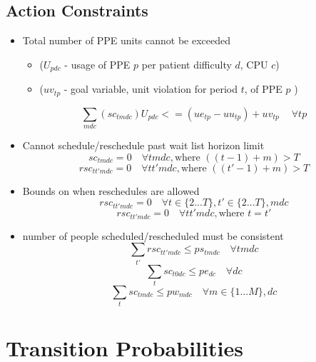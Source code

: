 \documentclass{article}
\begin{document}
\subsection{Action Constraints}
\begin{itemize}
    \item Total number of PPE units cannot be exceeded  
    \begin{itemize}
    	\item ($U_{pdc}$ - usage of PPE $p$ per patient difficulty $d$, CPU $c$)
    	\item ($uv_{tp}$ - goal variable, unit violation for period $t$, of PPE $p$ )
    \end{itemize}
        \[ \sum_{mdc}(sc_{tmdc})U_{pdc} <= (ue_{tp} - uu_{tp}) + uv_{tp}\ \quad \forall tp \]
	\item Cannot schedule/reschedule past wait list horizon limit
		\[ sc_{tmdc} = 0 \quad \forall tmdc, \text{where } ((t-1)+m) > T \]
		\[ rsc_{tt'mdc} = 0 \quad \forall tt'mdc, \text{where } ((t'-1)+m) > T \]
	\item Bounds on when reschedules are allowed
		\[ rsc_{tt'mdc} = 0 \quad \forall t \in \{ 2...T \}, t' \in \{ 2...T \}, mdc \]
		\[ rsc_{tt'mdc} = 0 \quad \forall tt'mdc, \text{where } t=t' \]
	
	\item number of people scheduled/rescheduled must be consistent
		\[ \sum_{t'} rsc_{tt'mdc} \le ps_{tmdc} \quad \forall tmdc \]
		\[ \sum_{t} sc_{t0dc} \le pe_{dc} \quad \forall dc \]
		\[ \sum_{t} sc_{tmdc} \le pw_{mdc} \quad \forall m \in \{1...M \}, dc \]
\end{itemize}

\section{Transition Probabilities}
\end{document}
